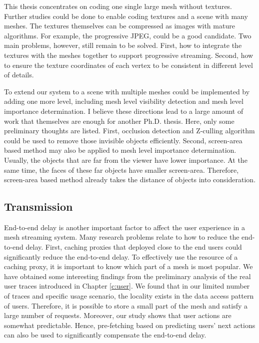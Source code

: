 This thesis concentrates on coding one single large mesh without textures.
Further studies could be done to enable coding textures and a scene with many meshes. 
The textures themselves can be compressed as images with mature algorithms. 
For example, the progressive JPEG, could be a good candidate. 
Two main problems, however, still remain to be solved.
First, how to integrate the textures with the meshes together to support progressive streaming.
Second, how to ensure the texture coordinates of each vertex to be consistent in different level
of details. 

To extend our system to a scene with multiple meshes could be implemented by adding
one more level, including mesh level visibility detection and mesh level importance determination.
I believe these directions lead to a large amount of work that themselves are enough for another Ph.D. thesis.
Here, only some preliminary thoughts are listed.
First, occlusion detection and Z-culling algorithm could be used to remove those invisible objects efficiently. 
Second, screen-area based method may also be applied to mesh level importance determination.
Usually, the objects that are far from the viewer have lower importance. At the same time, 
the faces of these far objects have smaller screen-area. Therefore, screen-area based method
already takes the distance of objects into consideration.

\subsection{Transmission}
End-to-end delay is another important factor to affect the user experience in 
a mesh streaming system.
Many research problems relate to how to reduce the end-to-end delay.
First, caching proxies that deployed close to the end users could significantly
reduce the end-to-end delay. To effectively use the resource of a caching proxy,
it is important to know which part of a mesh is most popular.
We have obtained some interesting findings from the preliminary analysis of the real user
traces introduced in Chapter \ref{c:user}. 
We found that in our limited number of traces and specific usage scenario, 
the locality exists in the data access pattern of users.
Therefore, it is possible to store a small part of the mesh and satisfy a large number
of requests. Moreover, our study shows that user actions are somewhat predictable.
Hence, pre-fetching based on predicting users' next actions can also be used to significantly
compensate the end-to-end delay.

